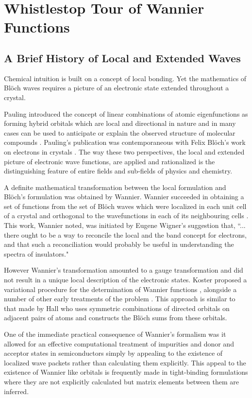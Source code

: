 \chapter{Whistlestop Tour of Wannier Functions}
\label{chap:wannier}
\section{A Brief History of Local and Extended Waves}
Chemical intuition is built on a concept of local bonding. 
Yet the mathematics of Bl\"och waves requires a picture of an 
electronic state extended throughout a crystal.

Pauling introduced the concept of linear combinations of atomic eigenfunctions
as forming hybrid orbitals which are local and directional in nature and
in many cases can be used to anticipate or explain the observed structure
of molecular compounds \cite{pauling28}. Pauling's publication was contemporaneous
with Felix Bl\"och's work on electrons in crystals \cite{bloch29}. The
way these two perspectives, the local and extended picture of electronic wave functions, 
are applied and rationalized is the distinguishing feature 
of entire fields and sub-fields of physics and chemistry.

A definite mathematical transformation between the local formulation
and Bl\"och's formulation was obtained by Wannier. 
Wannier succeeded in obtaining a set of functions
from the set of Bl\"och waves which were localized in each unit cell
of a crystal and orthogonal to the wavefunctions in each of its
neighbouring cells \cite{wannier37, wannier62}. 
This work, Wannier noted, was initiated by Eugene Wigner's suggestion that, 
``... there ought to be a way to reconcile the local and the band concept 
for electrons, and that such a reconciliation would probably be useful in 
understanding the spectra of insulators." 

However Wannier's transformation amounted to a gauge transformation
and did not result in a unique local description of the electronic states.
Koster proposed a variational procedure for the determination 
of Wannier functions \cite{koster53},
alongside a number of other early treatments of the problem \cite{winston54}.
This approach is similar to that made by Hall \cite{hall52} who uses symmetric  
combinations of directed orbitals on adjacent pairs of atoms and constructs 
the Bl\"och sums from these orbitals.

One of the immediate practical consequence of Wannier's formalism was
it allowed for an effective computational treatment of impurities 
and donor and acceptor states in semiconductors \cite{slater49,kittel54} simply
by appealing to the existence of localized wave packets rather than calculating
them explicitly. This appeal to the existence of Wannier like orbitals is frequently made in
tight-binding formulations where they are not explicitly calculated but
matrix elements between them are inferred.

